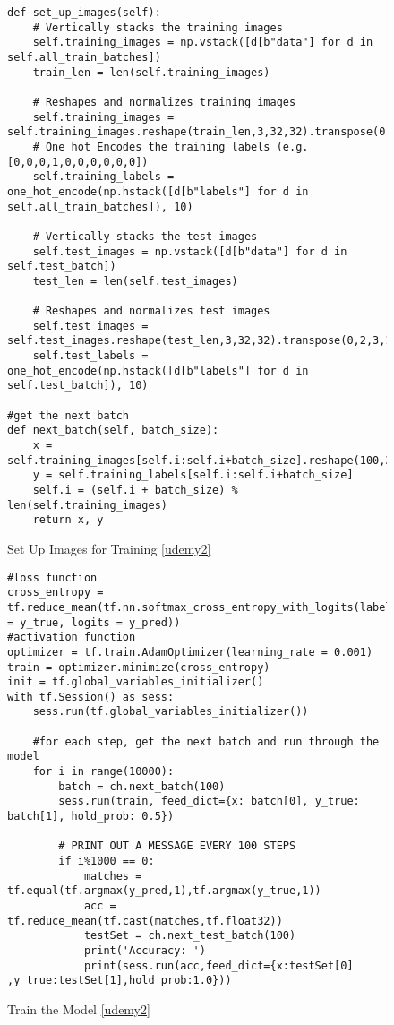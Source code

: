 \begin{figure}[h]
\caption{Set Up Images for Training \ref{udemy2}}
\label{lst:setUpImages}
\begin{lstlisting}[style=Python]
def set_up_images(self):
    # Vertically stacks the training images
    self.training_images = np.vstack([d[b"data"] for d in self.all_train_batches])
    train_len = len(self.training_images)
    
    # Reshapes and normalizes training images
    self.training_images = self.training_images.reshape(train_len,3,32,32).transpose(0,2,3,1)/255
    # One hot Encodes the training labels (e.g. [0,0,0,1,0,0,0,0,0,0])
    self.training_labels = one_hot_encode(np.hstack([d[b"labels"] for d in self.all_train_batches]), 10)

    # Vertically stacks the test images
    self.test_images = np.vstack([d[b"data"] for d in self.test_batch])
    test_len = len(self.test_images)
    
    # Reshapes and normalizes test images
    self.test_images = self.test_images.reshape(test_len,3,32,32).transpose(0,2,3,1)/255
    self.test_labels = one_hot_encode(np.hstack([d[b"labels"] for d in self.test_batch]), 10)
    
#get the next batch
def next_batch(self, batch_size):
    x = self.training_images[self.i:self.i+batch_size].reshape(100,32,32,3)
    y = self.training_labels[self.i:self.i+batch_size]
    self.i = (self.i + batch_size) % len(self.training_images)
    return x, y
\end{lstlisting}
\end{figure}

\begin{figure}[h]
\caption{Train the Model \ref{udemy2}}
\label{lst:trainModel2}
\begin{lstlisting}[style=Python]
#loss function
cross_entropy = tf.reduce_mean(tf.nn.softmax_cross_entropy_with_logits(labels = y_true, logits = y_pred))
#activation function
optimizer = tf.train.AdamOptimizer(learning_rate = 0.001)
train = optimizer.minimize(cross_entropy)
init = tf.global_variables_initializer()
with tf.Session() as sess:
    sess.run(tf.global_variables_initializer())

    #for each step, get the next batch and run through the model
    for i in range(10000):
        batch = ch.next_batch(100)
        sess.run(train, feed_dict={x: batch[0], y_true: batch[1], hold_prob: 0.5})
        
        # PRINT OUT A MESSAGE EVERY 100 STEPS
        if i%1000 == 0:
            matches = tf.equal(tf.argmax(y_pred,1),tf.argmax(y_true,1))
            acc = tf.reduce_mean(tf.cast(matches,tf.float32))
            testSet = ch.next_test_batch(100)
            print('Accuracy: ')
            print(sess.run(acc,feed_dict={x:testSet[0] ,y_true:testSet[1],hold_prob:1.0}))
\end{lstlisting}
\end{figure}

